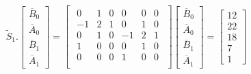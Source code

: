 \documentclass{article}
\begin{document}
\[
\tilde{S}_1.\left[
    \begin{array}{c}
        \overline{B}_0\\
        \overline{A}_0\\
        \overline{B}_1\\
        \overline{A}_1
    \end{array}
\right]=\left[
    \begin{array}{cccccc}
        \begin{array}{ccccc}
            0 & 1 & 0 & 0 & 0 & 0\\
            -1 & 2 & 1 & 0 & 1 & 0\\
            0 & 1 & 0 & -1 & 2 & 1\\
            1 & 0 & 0 & 0 & 1 & 0\\
            0 & 0 & 0 & 1 & 0 & 0\\
        \end{array}
    \end{array}
\right]
\left[
    \begin{array}{c}
        \overline{B}_0\\
        \overline{A}_0\\
        \overline{B}_1\\
        \overline{A}_1
    \end{array}
\right]=
\left[
    \begin{array}{c}
        12\\
        22\\
        18\\
        7\\
        1
    \end{array}
\right]
\]
\end{document}
